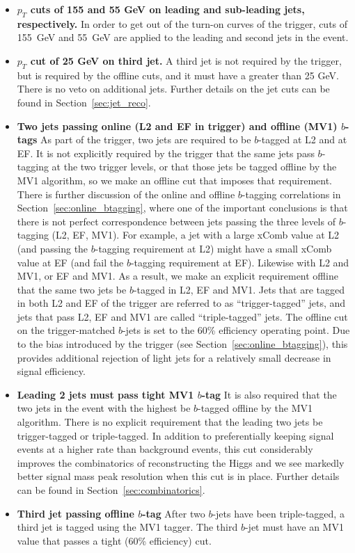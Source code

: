 \begin{itemize}
\item
\textbf{$p_T$ cuts of 155 and 55 GeV on leading and sub-leading jets, respectively.}
In order to get out of the \pt turn-on curves of the trigger, cuts of
155~GeV and 55~GeV are applied to the leading and second jets in the
event.
\item
\textbf{$p_T$ cut of 25 GeV on third jet.}
A third jet is not required by the trigger, but is required by
the offline cuts, and it must have a \pt greater than 25 GeV.  There is
no veto on additional jets.  Further details on the jet cuts can be found
in Section~\ref{sec:jet_reco}.
\item
\textbf{Two jets passing online (L2 and EF in trigger) and offline (MV1) $b$-tags}
As part of the trigger, two jets are required to be $b$-tagged at L2 and at EF.  It
is not explicitly required by the trigger that the same jets pass $b$-tagging at the two trigger levels,
or that those jets be tagged offline by the MV1 algorithm, so we make an
offline cut that imposes that requirement.  There is further discussion of the online
and offline $b$-tagging correlations in Section~\ref{sec:online_btagging},
where one of the important conclusions is that there is not perfect correspondence
between jets passing the three levels of $b$-tagging (L2, EF, MV1).  For
example, a jet with a large xComb value at L2 (and passing the $b$-tagging
requirement at L2) might have a small xComb value at EF (and fail the $b$-tagging
requirement at EF).  Likewise with L2 and MV1, or EF and MV1.  As a result, we
make an explicit requirement offline that the same two jets be $b$-tagged in L2, EF
and MV1.  Jets that are tagged in both L2 and EF of the trigger are referred to as
``trigger-tagged'' jets, and jets that pass L2, EF and MV1 are called ``triple-tagged''
jets.
The offline cut on the
trigger-matched $b$-jets is set to the 60\% efficiency
operating point. Due to the bias introduced by the trigger (see
Section~\ref{sec:online_btagging}), this provides additional rejection of
light jets for a relatively small decrease in signal efficiency.


\item\textbf{Leading 2 jets must pass tight MV1 $b$-tag}
It is also required that the two jets in the event with the highest \pt be $b$-tagged
offline by the MV1 algorithm.  There is no explicit requirement that the leading
two jets be trigger-tagged or triple-tagged.
  In addition to preferentially keeping signal events at a higher rate than
background events, this cut considerably improves the combinatorics of reconstructing
the Higgs and we see markedly better signal mass peak resolution when this cut is in
place.  Further details can be found in Section~\ref{sec:combinatorics}.


\item
\textbf{Third jet passing offline $b$-tag}
After two
$b$-jets have been triple-tagged, a third jet is tagged using the MV1 tagger.  The third
$b$-jet must have an MV1 value that passes a tight (60\% efficiency)
cut.

\end{itemize}




